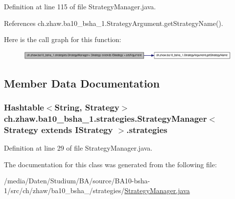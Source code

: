 Definition at line 115 of file StrategyManager.java.

References ch.zhaw.ba10\_\-bsha\_\-1.StrategyArgument.getStrategyName().

Here is the call graph for this function:\nopagebreak
\begin{figure}[H]
\begin{center}
\leavevmode
\includegraphics[width=392pt]{classch_1_1zhaw_1_1ba10__bsha__1_1_1strategies_1_1StrategyManager_3_01Strategy_01extends_01IStrategy_01_4_acc0184c50f60dfb73730396fd6eab5c6_cgraph}
\end{center}
\end{figure}


\subsection{Member Data Documentation}
\hypertarget{classch_1_1zhaw_1_1ba10__bsha__1_1_1strategies_1_1StrategyManager_3_01Strategy_01extends_01IStrategy_01_4_adfc4680217e5979e5fac088970e0852f}{
\subsubsection[{strategies}]{\setlength{\rightskip}{0pt plus 5cm}Hashtable$<$String, Strategy$>$ ch.zhaw.ba10\_\-bsha\_\-1.strategies.StrategyManager$<$ Strategy extends {\bf IStrategy} $>$.{\bf strategies}}}
\label{classch_1_1zhaw_1_1ba10__bsha__1_1_1strategies_1_1StrategyManager_3_01Strategy_01extends_01IStrategy_01_4_adfc4680217e5979e5fac088970e0852f}


Definition at line 29 of file StrategyManager.java.

The documentation for this class was generated from the following file:\begin{DoxyCompactItemize}
\item 
/media/Daten/Studium/BA/source/BA10-\/bsha-\/1/src/ch/zhaw/ba10\_\-bsha\_/strategies/\hyperlink{StrategyManager_8java}{StrategyManager.java}\end{DoxyCompactItemize}
